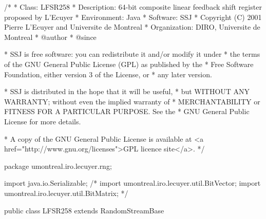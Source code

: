 \begin{code}
\begin{hide}
/*
 * Class:        LFSR258
 * Description:  64-bit composite linear feedback shift register proposed by L'Ecuyer
 * Environment:  Java
 * Software:     SSJ
 * Copyright (C) 2001  Pierre L'Ecuyer and Universite de Montreal
 * Organization: DIRO, Universite de Montreal
 * @author
 * @since

 * SSJ is free software: you can redistribute it and/or modify it under
 * the terms of the GNU General Public License (GPL) as published by the
 * Free Software Foundation, either version 3 of the License, or
 * any later version.

 * SSJ is distributed in the hope that it will be useful,
 * but WITHOUT ANY WARRANTY; without even the implied warranty of
 * MERCHANTABILITY or FITNESS FOR A PARTICULAR PURPOSE.  See the
 * GNU General Public License for more details.

 * A copy of the GNU General Public License is available at
   <a href="http://www.gnu.org/licenses">GPL licence site</a>.
 */
\end{hide}
package umontreal.iro.lecuyer.rng;  \begin{hide}

import java.io.Serializable;
/*
import umontreal.iro.lecuyer.util.BitVector;
import umontreal.iro.lecuyer.util.BitMatrix;
*/
\end{hide}

public class LFSR258 extends RandomStreamBase \begin{hide} {

   private static final long serialVersionUID = 140406L;
   //La date de modification a l'envers, lire 06/04/2014
   //La date de modification a l'envers, lire 10/05/2007

    //private static final double NORM = 5.4210108624275221e-20;

    //equivalent a NORM = 1.0 / 0xFFFFFFFFFFFFF800L
    private static final double NORM = 0.5 / 0x7FFFFFFFFFFFFC00L;
    private static final double MAX = 0xFFFFFFFFFFFFF800L * NORM + 1.0;
    //MAX = plus grand double < 1.0

   private static final long GERME = 123456789123456789L;

    private long z0, z1, z2, z3, z4;       // l'etat

    //stream and substream variables :
    private long[] stream;
    private long[] substream;
    private static long[] curr_stream = {GERME, GERME, GERME, GERME, GERME};

  \end{hide}
\end{code}


